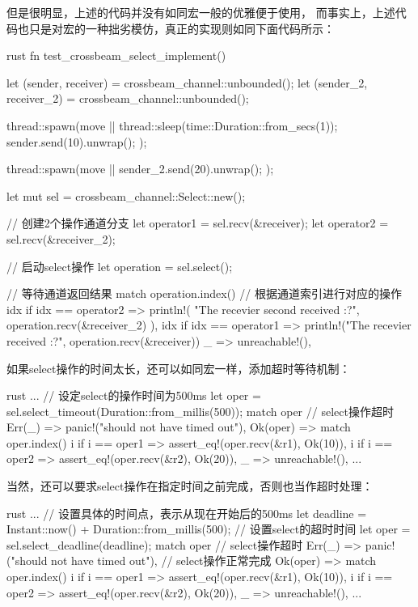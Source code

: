 但是很明显，上述的代码并没有如同宏一般的优雅便于使用，
而事实上，上述代码也只是对宏的一种拙劣模仿，真正的实现则如同下面代码所示：
\begin{code-block}{rust}
fn test_crossbeam_select_implement() {
    let (sender, receiver) = crossbeam_channel::unbounded();
    let (sender_2, receiver_2) = crossbeam_channel::unbounded();

    thread::spawn(move || {
        thread::sleep(time::Duration::from_secs(1));
        sender.send(10).unwrap();
    });

    thread::spawn(move || {
        sender_2.send(20).unwrap();
    });

    let mut sel = crossbeam_channel::Select::new();

    // 创建2个操作通道分支
    let operator1 = sel.recv(&receiver);
    let operator2 = sel.recv(&receiver_2);

    // 启动select操作
    let operation = sel.select();

    // 等待通道返回结果
    match operation.index() {
        // 根据通道索引进行对应的操作
        idx if idx == operator2 => println!(
            "The recevier second  received {:?}",
            operation.recv(&receiver_2)
        ),
        idx if idx == operator1 => {
            println!("The recevier received {:?}", operation.recv(&receiver))
        }
        _ => unreachable!(),
    }
}
\end{code-block}

如果select操作的时间太长，还可以如同宏一样，添加超时等待机制：
\begin{code-block}{rust}
...
// 设定select的操作时间为500ms
let oper = sel.select_timeout(Duration::from_millis(500));
match oper {
    // select操作超时
    Err(_) => panic!("should not have timed out"),
    Ok(oper) => match oper.index() {
        i if i == oper1 => assert_eq!(oper.recv(&r1), Ok(10)),
        i if i == oper2 => assert_eq!(oper.recv(&r2), Ok(20)),
        _ => unreachable!(),
    }
}
...
\end{code-block}

当然，还可以要求select操作在指定时间之前完成，否则也当作超时处理：
\begin{code-block}{rust}
...
// 设置具体的时间点，表示从现在开始后的500ms
let deadline = Instant::now() + Duration::from_millis(500);
// 设置select的超时时间
let oper = sel.select_deadline(deadline);
match oper {
    // select操作超时
    Err(_) => panic!("should not have timed out"),
    // select操作正常完成
    Ok(oper) => match oper.index() {
        i if i == oper1 => assert_eq!(oper.recv(&r1), Ok(10)),
        i if i == oper2 => assert_eq!(oper.recv(&r2), Ok(20)),
        _ => unreachable!(),
    }
}
...
\end{code-block}

